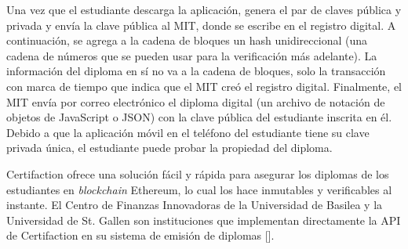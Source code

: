 

Una vez que el estudiante descarga la aplicación, genera el par de claves pública y privada y envía la clave pública al MIT, donde se escribe en el registro digital. A continuación, se agrega a la cadena de bloques un hash unidireccional (una cadena de números que se pueden usar para la verificación más adelante). La información del diploma en sí no va a la cadena de bloques, solo la transacción con marca de tiempo que indica que el MIT creó el registro digital. Finalmente, el MIT envía por correo electrónico el diploma digital (un archivo de notación de objetos de JavaScript o JSON) con la clave pública del estudiante inscrita en él. Debido a que la aplicación móvil en el teléfono del estudiante tiene su clave privada única, el estudiante puede probar la propiedad del diploma.




Certifaction ofrece una solución fácil y rápida para asegurar los diplomas de los estudiantes en \textit{blockchain} Ethereum, lo cual los hace inmutables y verificables al instante. El Centro de Finanzas Innovadoras de la Universidad de Basilea y la Universidad de St. Gallen son instituciones que implementan directamente la API de Certifaction en su sistema de emisión de diplomas [\cite{82}].


